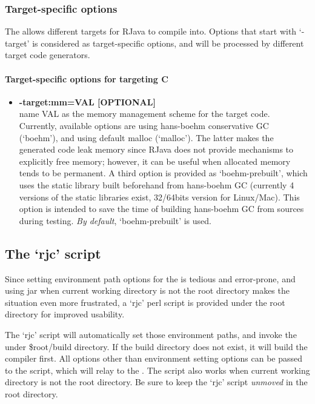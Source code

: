 \documentclass[12pt]{article}
\begin{document}
\subsubsection*{Target-specific options}
The \rjc allows different targets for RJava to compile into. 
Options that start with
`-target' is considered as target-specific options, and will be
processed by different target code generators. 

\paragraph*{Target-specific options for targeting C}

\begin{itemize}
\item
\textbf{-target:mm=VAL [OPTIONAL]\\}
name VAL as the memory management scheme for 
the target code. Currently, available options are 
using hans-boehm conservative GC (`boehm'),
and using default malloc (`malloc'). The latter makes
the generated code leak memory since RJava does 
not provide mechanisms to explicitly free memory;
however, it can be useful when allocated memory tends
to be permanent. A third option is provided as 
`boehm-prebuilt', which uses the static library built beforehand
from hans-boehm GC (currently 4 versions of the static libraries
exist, 32/64bits version for Linux/Mac). 
This option is intended to save
the time of building hans-boehm GC from sources during testing. 
\emph{By default}, `boehm-prebuilt' is used. 

\end{itemize}

\subsection{The `rjc' script}

Since setting environment path options for the \rjcfull is 
tedious and error-prone, and using \rjc jar when current
working directory is not the \rjc root directory makes the situation 
even more frustrated, 
a `rjc' perl script is provided under the root directory for
improved usability. 

The `rjc' script will automatically set
those environment paths, and invoke the \rjcfull under 
\$root/build directory. If the build directory does not exist, 
it will build the compiler first. 
All options other than environment setting options can be passed
to the script, which will relay to the \rjcfull. 
The script also works when current working directory is not the
\rjc root directory. 
Be sure to keep the `rjc' script \emph{unmoved} in the \rjc root
directory. 
\end{document}
